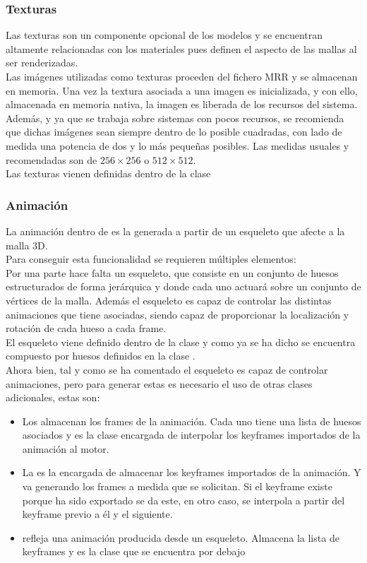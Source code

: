 \subsubsection{Texturas}
Las texturas son un componente opcional de los modelos y se encuentran altamente relacionadas con los materiales pues definen el aspecto de las mallas al ser renderizadas.\\
Las imágenes utilizadas como texturas proceden del fichero MRR y se almacenan en memoria. Una vez la textura asociada a una imagen es inicializada, y con ello, almacenada en memoria nativa, la imagen es liberada de los recursos del sistema.\\
Además, y ya que se trabaja sobre sistemas con pocos recursos, se recomienda que dichas imágenes sean siempre dentro de lo posible cuadradas, con lado de medida una potencia de dos y lo más pequeñas posibles. Las medidas usuales y recomendadas son de $256\times 256$ o $512\times 512$.\\

Las texturas vienen definidas dentro de la clase \roreftexture

\subsubsection{Animación}
La animación dentro de \robotto es la generada a partir de un esqueleto que afecte a la malla 3D.\\
Para conseguir esta funcionalidad se requieren múltiples elementos:\\

Por una parte hace falta un esqueleto, que consiste en un conjunto de huesos estructurados de forma jerárquica y donde cada uno actuará sobre un conjunto de vértices de la malla. Además el esqueleto es capaz de controlar las distintas animaciones que tiene asociadas, siendo capaz de proporcionar la localización y rotación de cada hueso a cada frame.\\
El esqueleto viene definido dentro de la clase \rorefskeleton y como ya se ha dicho se encuentra compuesto por huesos definidos en la clase \rorefbone.\\

Ahora bien, tal y como se ha comentado el esqueleto es capaz de controlar animaciones, pero para generar estas es necesario el uso de otras clases adicionales, estas son:

\begin{itemize}
\item Los \rorefframe almacenan los frames de la animación. Cada uno tiene una lista de huesos asociados y es la clase encargada de interpolar los keyframes importados de la animación al motor. 
\item La \rorefkeyframelist es la encargada de almacenar los keyframes importados de la animación. Y va generando los frames a medida que se solicitan. Si el keyframe existe porque ha sido exportado se da este, en otro caso, se interpola a partir del keyframe previo a él y el siguiente.
\item \rorefskeletalaction refleja una animación producida desde un esqueleto. Almacena la lista de keyframes y es la clase que se encuentra por debajo  
\end{itemize}

